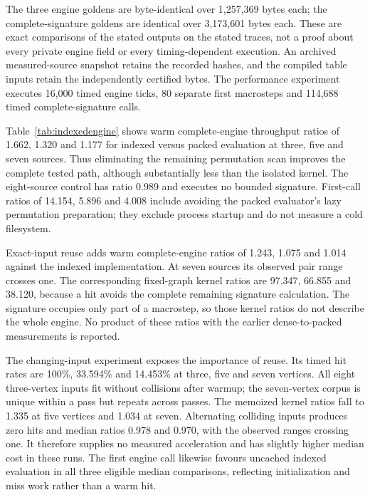 \documentclass[11pt,a4paper]{article}
\theoremstyle{definition}\newtheorem{definition}[theorem]{Definition}
\begin{document}
The three engine goldens are byte-identical over 1,257,369 bytes each; the complete-signature goldens are identical over 3,173,601 bytes each. These are exact comparisons of the stated outputs on the stated traces, not a proof about every private engine field or every timing-dependent execution. An archived measured-source snapshot retains the recorded hashes, and the compiled table inputs retain the independently certified bytes. The performance experiment executes 16,000 timed engine ticks, 80 separate first macrosteps and 114,688 timed complete-signature calls.



Table~\ref{tab:indexedengine} shows warm complete-engine throughput ratios of 1.662, 1.320 and 1.177 for indexed versus packed evaluation at three, five and seven sources. Thus eliminating the remaining permutation scan improves the complete tested path, although substantially less than the isolated kernel. The eight-source control has ratio 0.989 and executes no bounded signature. First-call ratios of 14.154, 5.896 and 4.008 include avoiding the packed evaluator's lazy permutation preparation; they exclude process startup and do not measure a cold filesystem.

Exact-input reuse adds warm complete-engine ratios of 1.243, 1.075 and 1.014 against the indexed implementation. At seven sources its observed pair range crosses one. The corresponding fixed-graph kernel ratios are 97.347, 66.855 and 38.120, because a hit avoids the complete remaining signature calculation. The signature occupies only part of a macrostep, so those kernel ratios do not describe the whole engine. No product of these ratios with the earlier dense-to-packed measurements is reported.

The changing-input experiment exposes the importance of reuse. Its timed hit rates are 100\%, 33.594\% and 14.453\% at three, five and seven vertices. All eight three-vertex inputs fit without collisions after warmup; the seven-vertex corpus is unique within a pass but repeats across passes. The memoized kernel ratios fall to 1.335 at five vertices and 1.034 at seven. Alternating colliding inputs produces zero hits and median ratios 0.978 and 0.970, with the observed ranges crossing one. It therefore supplies no measured acceleration and has slightly higher median cost in these runs. The first engine call likewise favours uncached indexed evaluation in all three eligible median comparisons, reflecting initialization and miss work rather than a warm hit.
\end{document}

